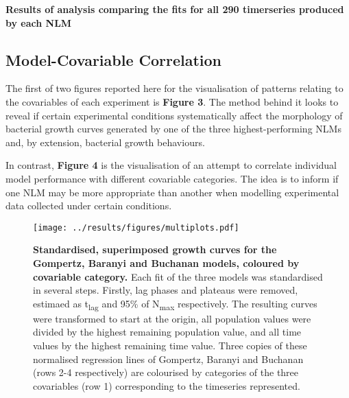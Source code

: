 \documentclass[11pt]{article}
\begin{document}
\begin{table}[htb]
    \centering
    \caption{\textbf{Results of analysis comparing the fits for all 290 timerseries produced by each NLM}}
\end{table}


\subsection{Model-Covariable Correlation}

The first of two figures reported here for the visualisation of patterns relating to the covariables of each experiment is \textbf{Figure 3}. The method behind it looks to reveal if certain experimental conditions systematically affect the morphology of bacterial growth curves generated by one of the three highest-performing NLMs and, by extension, bacterial growth behaviours.

In contrast, \textbf{Figure 4} is the visualisation of an attempt to correlate individual model performance with different covariable categories. The idea is to inform if one NLM may be more appropriate than another when modelling experimental data collected under certain conditions.


\begin{figure*}
    \centering
    \texttt{[image: ../results/figures/multiplots.pdf]} %
    \caption{\textbf{Standardised, superimposed growth curves for the Gompertz, Baranyi and Buchanan models, coloured by covariable category.}  Each fit of the three models was standardised in several steps. Firstly, lag phases and plateaus were removed, estimaed as t\textsubscript{lag} and 95\% of N\textsubscript{max} respectively. The resulting curves were transformed to start at the origin, all population values were divided by the highest remaining population value, and all time values by the highest remaining time value. Three copies of these normalised regression lines of Gompertz, Baranyi and Buchanan (rows 2-4 respectively) are colourised by categories of the three covariables (row 1) corresponding to the timeseries represented.}
\end{figure*}
\end{document}
